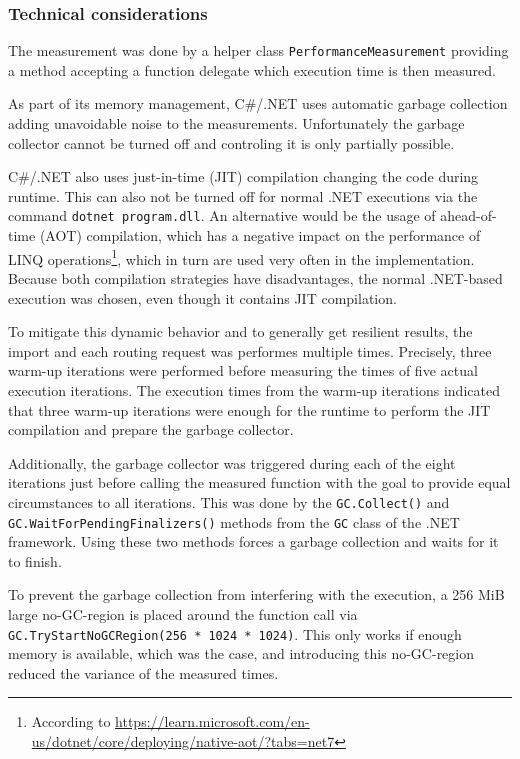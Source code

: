 		\subsubsection{Technical considerations}
		
			The measurement was done by a helper class \texttt{PerformanceMeasurement} providing a method accepting a function delegate which execution time is then measured.
			
			As part of its memory management, C\#/.NET uses automatic garbage collection adding unavoidable noise to the measurements.
			Unfortunately the garbage collector cannot be turned off and controling it is only partially possible.
		
			C\#/.NET also uses just-in-time (JIT) compilation changing the code during runtime.
			This can also not be turned off for normal .NET executions via the command \texttt{dotnet program.dll}.
			An alternative would be the usage of ahead-of-time (AOT) compilation, which has a negative impact on the performance of LINQ operations\footnote{According to \url{https://learn.microsoft.com/en-us/dotnet/core/deploying/native-aot/?tabs=net7}}, which in turn are used very often in the implementation.
			Because both compilation strategies have disadvantages, the normal .NET-based execution was chosen, even though it contains JIT compilation.
			
			To mitigate this dynamic behavior and to generally get resilient results, the import and each routing request was performes multiple times.
			Precisely, three warm-up iterations were performed before measuring the times of five actual execution iterations.
			The execution times from the warm-up iterations indicated that three warm-up iterations were enough for the runtime to perform the JIT compilation and prepare the garbage collector.
			
			Additionally, the garbage collector was triggered during each of the eight iterations just before calling the measured function with the goal to provide equal circumstances to all iterations.
			This was done by the \texttt{GC.Collect()} and \texttt{GC.WaitForPendingFinalizers()} methods from the \texttt{GC} class of the .NET framework.
			Using these two methods forces a garbage collection and waits for it to finish\cite{ms-gc}.
			
			To prevent the garbage collection from interfering with the execution, a 256 MiB large no-GC-region is placed around the function call via \texttt{GC.TryStartNoGCRegion(256 * 1024 * 1024)}.
			This only works if enough memory is available\cite{ms-no-gc-region}, which was the case, and introducing this no-GC-region reduced the variance of the measured times.
			
